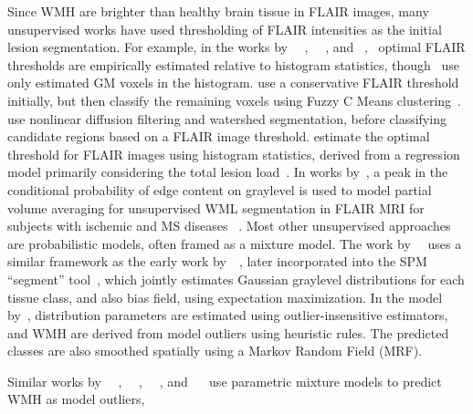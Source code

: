 Since WMH are brighter than healthy brain tissue in FLAIR images,
many unsupervised works have used thresholding of FLAIR intensities
as the initial lesion segmentation.
For example, in the works by%
~\citeauthor{Jack2001}~\cite{Jack2001},%
~\citeauthor{DeBoer2009b}~\cite{DeBoer2009b}, and%
~\citeauthor{Smart2011},~\cite{Smart2011}
optimal FLAIR thresholds are empirically estimated relative to histogram statistics,
though~\citeauthor{DeBoer2009b} use only estimated GM voxels in the histogram.
\citeauthor{Gibson2010} use a conservative FLAIR threshold initially,
but then classify the remaining voxels using Fuzzy C Means clustering~\cite{Gibson2010}.
\citeauthor{Samaille2012} use nonlinear diffusion filtering and watershed segmentation,
before classifying candidate regions based on a FLAIR image threshold.
\citeauthor{Yoo2014} estimate the optimal threshold for FLAIR images using histogram statistics,
derived from a regression model primarily considering the total lesion load~\cite{Yoo2014}.
In works by~\citeauthor{Khademi2014}, a peak in the conditional probability
of edge content on graylevel is used to model partial volume averaging
for unsupervised WML segmentation in FLAIR MRI for subjects with ischemic and MS diseases%
~\cite{Khademi2014,Khademi2015,Knight2016a}.
Most other unsupervised approaches are probabilistic models, often framed as a mixture model.
The work by~\citeauthor{VanLeemput2001}~\cite{VanLeemput2001} uses
a similar framework as the early work by~\citeauthor{Ashburner1997}~\cite{Ashburner1997},
later incorporated into the SPM ``segment'' tool~\cite{Ashburner2005},
which jointly estimates Gaussian graylevel distributions for each tissue class, and also bias field,
using expectation maximization.
In the model by~\citeauthor{VanLeemput2001},
distribution parameters are estimated using outlier-insensitive estimators,
and WMH are derived from model outliers using heuristic rules.
The predicted classes are also smoothed spatially using a Markov Random Field (MRF).
\par
Similar works by%
~\citeauthor{Bricq2008}~\cite{Bricq2008},%
~\citeauthor{Schmidt2012}~\cite{Schmidt2012},%
~\citeauthor{Jain2015}~\cite{Jain2015}, and%
~\citeauthor{Roura2015}~\cite{Roura2015}
use parametric mixture models to predict WMH as model outliers,
